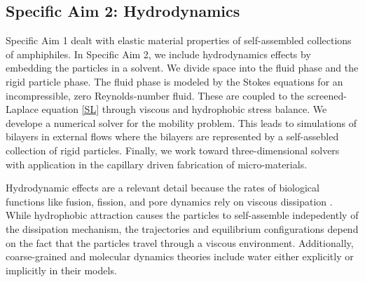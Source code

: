 \subsection{Specific Aim 2: Hydrodynamics}
\label{subsec:specific_aim_2}
Specific Aim 1 dealt with elastic material properties of self-assembled collections of amphiphiles.
In Specific Aim 2, we include hydrodynamics effects by embedding the particles in a solvent. 
We divide space into the fluid phase and the rigid particle phase.
The fluid phase is modeled by the Stokes equations for an incompressible, zero Reynolds-number fluid. These are coupled to the screened-Laplace equation \eqref{SL}
through viscous and hydrophobic stress balance.
We develope a numerical solver for the mobility problem. 
This leads to simulations of bilayers in external flows where the bilayers are represented by a self-assebled collection of rigid particles.
Finally, we work toward three-dimensional solvers with application in the capillary driven fabrication of micro-materials. 

Hydrodynamic effects are a relevant detail 
because the rates of biological functions like fusion, fission, and pore dynamics rely on viscous dissipation \cite{RYHAM20112929}. 
While hydrophobic attraction causes the particles to self-assemble indepedently of the dissipation mechanism, the trajectories and
equilibrium configurations depend on the fact that the particles travel through a viscous environment. 
Additionally, coarse-grained and molecular dynamics theories include water either explicitly or implicitly in their models. 


